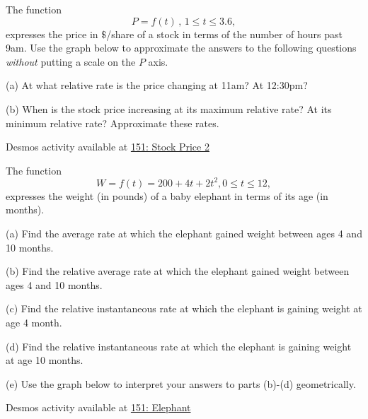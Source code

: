 \documentclass{ximera}
\begin{document}
\begin{question}  \label{Qdgbchhtt}

The function 
\[
      P = f(t) \, , \, 1\leq t \leq 3.6 , 
\]
expresses the price in $\$$/share of a stock in terms of the number of hours past 9am. Use the graph below to approximate the answers to the following questions \emph{without} putting a scale on the $P$ axis.

(a) At what relative rate is the price changing at 11am? At 12:30pm?

(b) When is the stock price increasing at its maximum relative rate? At its minimum relative rate? Approximate these rates.




\begin{onlineOnly}
    \begin{center}
\end{center}
\end{onlineOnly}


Desmos activity available at \href{https://www.desmos.com/calculator/jyebaj5jif}{151: Stock Price 2}



\end{question}


\begin{question}  \label{Q:354rgbytt}
The function
\[
    W = f(t) = 200+4t +2t^2 , 0\leq t \leq 12 ,
\]
expresses the weight (in pounds) of a baby elephant in terms of its age (in months).

(a) Find the average rate at which the elephant gained weight between ages 4 and 10 months.

(b) Find the relative average rate at which the elephant gained weight between ages 4 and 10 months.

(c) Find the relative instantaneous rate at which the elephant is gaining weight at age 4 month.

(d) Find the relative instantaneous rate at which the elephant is gaining weight at age 10 months.

(e) Use the graph below to interpret your answers to parts (b)-(d) geometrically.


\begin{onlineOnly}
    \begin{center}
\end{center}
\end{onlineOnly}


Desmos activity available at \href{https://www.desmos.com/calculator/2xj6xy7ggo}{151: Elephant}



\end{question}
\end{document}
